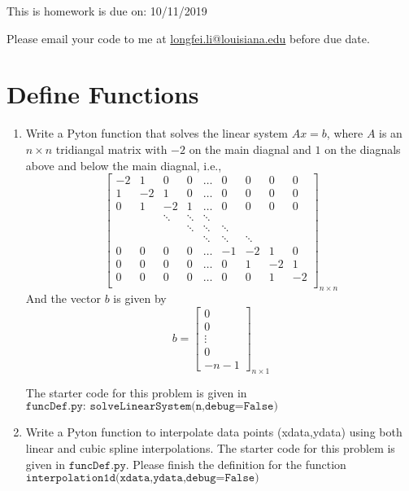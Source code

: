 \documentclass[11pt]{article}
\begin{document}
This is homework is due on: {\color{red}10/11/2019} 


Please email your code to me at \href{mailto:longfei.li@louisiana.edu}{longfei.li@louisiana.edu} before due date. \\


\section{Define Functions}\label{sec:funcDef}
 
\begin{enumerate}
\item Write a Pyton function that solves the linear system $Ax=b$, where $A$ is an $n\times n$ tridiangal matrix with $-2$ on the main diagnal and $1$ on the diagnals above and below the main diagnal, i.e.,
  $$
  \begin{bmatrix}
    -2 & 1 & 0 & 0 &\dots& 0  & 0&0 &0 \\
    1 & -2 & 1 & 0 &\dots& 0  & 0&0 &0\\
    0 & 1 & -2 & 1 &\dots&  0  & 0&0 &0\\
    &   &\ddots  & \ddots & \ddots & & &   \\
    &    &   &\ddots  & \ddots & \ddots & &    \\
    & & & &\ddots  & \ddots & \ddots &     \\
     0  & 0&0 &0 &\dots  & -1& -2 & 1 & 0 \\
     0  & 0&0 &0  &\dots& 0 & 1 & -2 & 1 \\
      0  & 0&0 &0  &\dots& 0 &  0 & 1 & -2 \\
    \end{bmatrix}_{n\times n}
  $$
  And the vector $b$ is given by
  $$
  b=\begin{bmatrix}
  0\\
  0\\
  \vdots\\
  0\\
  -n-1
  \end{bmatrix}_{n \times 1}
  $$

The starter code for this problem is given in $\texttt{funcDef.py: solveLinearSystem(n,debug=False)}$ 

\item
Write a Pyton  function to interpolate data points (xdata,ydata) using
  both linear and cubic spline interpolations.  The starter code for this problem is given in $\texttt{funcDef.py}$. Please finish the definition for the function $\texttt{interpolation1d(xdata,ydata,debug=False)}$


\end{enumerate}
\end{document}
